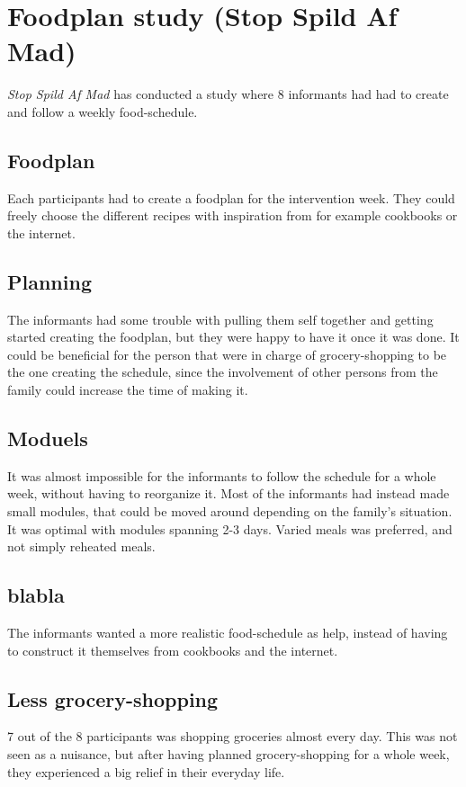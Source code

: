 \section{Foodplan study (Stop Spild Af Mad)}
\textit{Stop Spild Af Mad} has conducted a study where 8 informants had had to create and follow a weekly food-schedule.

\subsection{Foodplan}
Each participants had to create a foodplan for the intervention week. They could freely choose the different recipes with inspiration from for example cookbooks or the internet.

\subsection{Planning}
The informants had some trouble with pulling them self together and getting started creating the foodplan, but they were happy to have it once it was done. It could be beneficial for the person that were in charge of grocery-shopping to be the one creating the schedule, since the involvement of other persons from the family could increase the time of making it.

\subsection{Moduels}
It was almost impossible for the informants to follow the schedule for a whole week, without having to reorganize it. Most of the informants had instead made small modules, that could be moved around depending on the family's situation. It was optimal with modules spanning 2-3 days. Varied meals was preferred, and not simply reheated meals.

\subsection{blabla}
The informants wanted a more realistic food-schedule as help, instead of having to construct it themselves from cookbooks and the internet.

\subsection{Less grocery-shopping}
7 out of the 8 participants was shopping groceries almost every day. This was not seen as a nuisance, but after having planned grocery-shopping for a whole week, they experienced a big relief in their everyday life.

